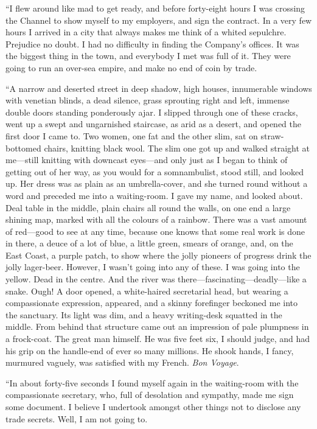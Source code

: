 \documentclass[12pt]{report}
\begin{document}
``I flew around like mad to get ready, and before forty-eight hours I
was crossing the Channel to show myself to my employers, and sign the
contract. In a very few hours I arrived in a city that always makes me
think of a whited sepulchre. Prejudice no doubt. I had no difficulty in
finding the Company's offices. It was the biggest thing in the town, and
everybody I met was full of it. They were going to run an over-sea
empire, and make no end of coin by trade.

``A narrow and deserted street in deep shadow, high houses, innumerable
windows with venetian blinds, a dead silence, grass sprouting right and
left, immense double doors standing ponderously ajar. I slipped through
one of these cracks, went up a swept and ungarnished staircase, as arid
as a desert, and opened the first door I came to. Two women, one fat and
the other slim, sat on straw-bottomed chairs, knitting black wool. The
slim one got up and walked straight at me---still knitting with downcast
eyes---and only just as I began to think of getting out of her way, as
you would for a somnambulist, stood still, and looked up. Her dress was
as plain as an umbrella-cover, and she turned round without a word and
preceded me into a waiting-room. I gave my name, and looked about. Deal
table in the middle, plain chairs all round the walls, on one end a
large shining map, marked with all the colours of a rainbow. There was a
vast amount of red---good to see at any time, because one knows that
some real work is done in there, a deuce of a lot of blue, a little
green, smears of orange, and, on the East Coast, a purple patch, to show
where the jolly pioneers of progress drink the jolly lager-beer.
However, I wasn't going into any of these. I was going into the yellow.
Dead in the centre. And the river was
there---fascinating---deadly---like a snake. Ough! A door opened, a
white-haired secretarial head, but wearing a compassionate expression,
appeared, and a skinny forefinger beckoned me into the sanctuary. Its
light was dim, and a heavy writing-desk squatted in the middle. From
behind that structure came out an impression of pale plumpness in a
frock-coat. The great man himself. He was five feet six, I should judge,
and had his grip on the handle-end of ever so many millions. He shook
hands, I fancy, murmured vaguely, was satisfied with my French.
\emph{Bon Voyage}.

``In about forty-five seconds I found myself again in the waiting-room
with the compassionate secretary, who, full of desolation and sympathy,
made me sign some document. I believe I undertook amongst other things
not to disclose any trade secrets. Well, I am not going to.
\end{document}
